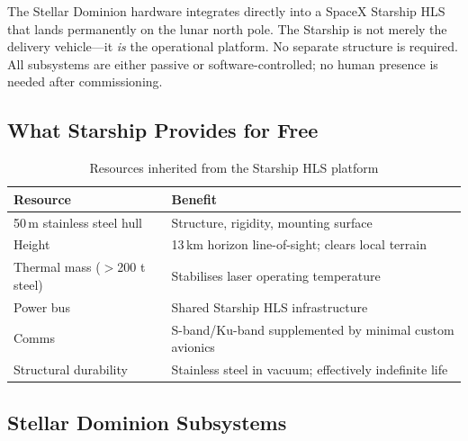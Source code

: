 \documentclass[10pt,letterpaper]{article}
\begin{document}
The Stellar Dominion hardware integrates directly into a SpaceX Starship HLS
that lands permanently on the lunar north pole. The Starship is not merely the
delivery vehicle---it \emph{is} the operational platform. No separate structure
is required. All subsystems are either passive or software-controlled; no
human presence is needed after commissioning.

\subsection{What Starship Provides for Free}

\begin{table}[!ht]
\centering\small
\caption{Resources inherited from the Starship HLS platform}
\label{tab:starship-resources}
\begin{tabularx}{\linewidth}{lX}
\toprule
\textbf{Resource} & \textbf{Benefit} \\
\midrule
50\,m stainless steel hull & Structure, rigidity, mounting surface \\
Height & 13\,km horizon line-of-sight; clears local terrain \\
Thermal mass ($>$200 t steel) & Stabilises laser operating temperature \\
Power bus & Shared Starship HLS infrastructure \\
Comms & S-band/Ku-band supplemented by minimal custom avionics \\
Structural durability & Stainless steel in vacuum; effectively indefinite life \\
\bottomrule
\end{tabularx}
\end{table}

\subsection{Stellar Dominion Subsystems}
\end{document}
